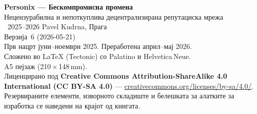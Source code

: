 \thispagestyle{empty}
\ifdefined\printmode\vspace*{\fill}\else{}\fi
\begin{flushleft}\small\sffamily
\textbf{Personix --- Бескомпромисна промена}\\[0.3em]
Нецензурабилна и непоткуплива децентрализирана репутациска мрежа\\[1.4em]

\textcopyright\ 2025--2026 Pavel Kudrna, Прага\\[0.4em]

Верзија~6 (2026-05-21)\\
Прв нацрт јуни--ноември 2025. Преработена април--мај 2026.\\[1.4em]

Сложено во \LaTeX{} (Tectonic) со Palatino и Helvetica\,Neue.\\
A5 пејзаж (210\,$\times$\,148\,mm).\\[1.4em]

Лиценцирано под \textbf{Creative Commons Attribution-ShareAlike 4.0
International (CC BY-SA 4.0)} ---
\href{https://creativecommons.org/licenses/by-sa/4.0/}{creativecommons.org/licenses/by-sa/4.0/}.
Резервираните елементи, изворното складиште и белешката за алатките за
изработка се наведени на крајот од книгата.
\end{flushleft}
\ifdefined\printmode\else{}\fi
\clearpage

